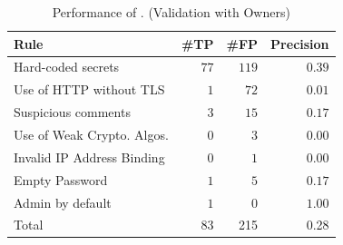 \begin{table}[t!]
  \small
  \centering
   \setlength{\tabcolsep}{9pt}
  \caption{\label{tab:maintainers}Performance of \slic. (Validation with Owners)}
  \vspace{-2ex}
  \begin{tabular}{lrrr} 
    \toprule
    Rule & \#TP & \#FP  & Precision\\
    \midrule
    Hard-coded secrets & $77$ & $119$ & $0.39$ \\
    Use of HTTP without TLS & $1$ & $72$ & $0.01$\\
    Suspicious comments & $3$ & $15$ & $0.17$\\
    Use of Weak Crypto. Algos. & $0$ & $3$ & $0.00$\\
    Invalid IP Address Binding & $0$ & $1$ & $0.00$\\
    Empty Password & $1$ & $5$ & $0.17$ \\
    Admin by default & $1$ & $0$ & $1.00$\\
    \midrule
    Total & 83 & 215 & 0.28\\
    \bottomrule 
  \end{tabular}
  \vspace{-2ex}  
\end{table}

